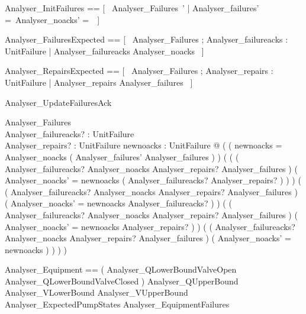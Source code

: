 \documentclass{article}
\begin{document}
\begin{zed}
	Analyser\_InitFailures == [~  Analyser\_Failures~' | Analyser\_failures' =~\emptyset \land Analyser\_noacks' =~\emptyset  ~]
\end{zed}

\begin{zed}
	Analyser\_FailuresExpected == [~  Analyser\_Failures ; Analyser\_failureacks : \power UnitFailure | Analyser\_failureacks \subseteq Analyser\_noacks  ~]
\end{zed}

\begin{zed}
	Analyser\_RepairsExpected == [~  Analyser\_Failures ; Analyser\_repairs : \power UnitFailure | Analyser\_repairs \subseteq Analyser\_failures  ~]
\end{zed}

\begin{schema}{Analyser\_UpdateFailuresAck}

 \Delta Analyser\_Failures \\
 Analyser\_failureacks? : \power UnitFailure \\
 Analyser\_repairs? : \power UnitFailure 
\where
 \exists newnoacks : \power UnitFailure @ ( ( newnoacks = Analyser\_noacks \cup ( Analyser\_failures' \setminus Analyser\_failures ) ) \land ( ( ( Analyser\_failureacks? \subseteq Analyser\_noacks \land Analyser\_repairs? \subseteq Analyser\_failures ) \implies ( Analyser\_noacks' = newnoacks \setminus ( Analyser\_failureacks? \cup Analyser\_repairs? ) ) ) \land ( ( Analyser\_failureacks? \subseteq Analyser\_noacks \land \lnot Analyser\_repairs? \subseteq Analyser\_failures ) \implies ( Analyser\_noacks' = newnoacks \setminus Analyser\_failureacks? ) ) \land ( ( \lnot Analyser\_failureacks? \subseteq Analyser\_noacks \land Analyser\_repairs? \subseteq Analyser\_failures ) \implies ( Analyser\_noacks' = newnoacks \setminus Analyser\_repairs? ) ) \land ( ( \lnot Analyser\_failureacks? \subseteq Analyser\_noacks \land \lnot Analyser\_repairs? \subseteq Analyser\_failures ) \implies ( Analyser\_noacks' = newnoacks ) ) ) )
\end{schema}

\begin{zed}
	Analyser\_Equipment == ( Analyser\_QLowerBoundValveOpen \lor Analyser\_QLowerBoundValveClosed ) \land Analyser\_QUpperBound \land Analyser\_VLowerBound \land Analyser\_VUpperBound \land Analyser\_ExpectedPumpStates \land Analyser\_EquipmentFailures
\end{zed}
\end{document}

